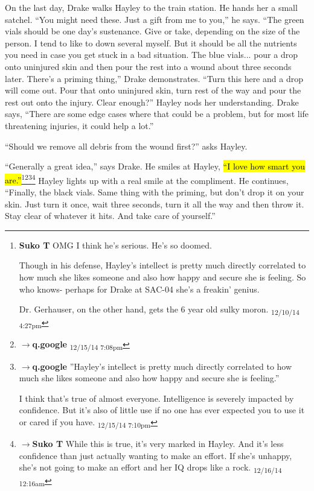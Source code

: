 On the last day, Drake walks Hayley to the train station.  He hands her a small satchel.  ``You might need these.  Just a gift from me to you,'' he says.  ``The green vials should be one day's sustenance.  Give or take, depending on the size of the person.  I tend to like to down several myself.  But it should be all the nutrients you need in case you get stuck in a bad situation.  The blue vials... pour a drop onto uninjured skin and then pour the rest into a wound about three seconds later.  There's a priming thing,'' Drake demonstrates. ``Turn this here and a drop will come out.  Pour that onto uninjured skin, turn rest of the way and pour the rest out onto the injury.  Clear enough?''  Hayley nods her understanding.  Drake says, ``There are some edge cases where that could be a problem, but for most life threatening injuries, it could help a lot.''

``Should we remove all debris from the wound first?'' asks Hayley.

``Generally a great idea,'' says Drake. He smiles at Hayley, \hl{``I love how smart you are.''}\footnote{\textbf{Suko T }OMG I think he's serious.  He's so doomed.

Though in his defense, Hayley's intellect is pretty much directly correlated to how much she likes someone and also how happy and secure she is feeling.  So who knows- perhaps for Drake at SAC-04 she's a freakin' genius.  

Dr. Gerhauser, on the other hand, gets the 6 year old sulky moron. \textsubscript{12/10/14 4:27pm}}\footnote{$\rightarrow$\textbf{q.google } \textsubscript{12/15/14 7:08pm}}\footnote{$\rightarrow$\textbf{q.google }''Hayley's intellect is pretty much directly correlated to how much she likes someone and also how happy and secure she is feeling.''

I think that's true of almost everyone.  Intelligence is severely impacted by confidence.  But it's also of little use if no one has ever expected you to use it or cared if you have. \textsubscript{12/15/14 7:10pm}}\footnote{$\rightarrow$\textbf{Suko T }While this is true, it's very marked in Hayley.  And it's less confidence than just actually wanting to make an effort.  If she's unhappy, she's not going to make an effort and her IQ drops like a rock. \textsubscript{12/16/14 12:16am}}   Hayley lights up with a real smile at the compliment.  He continues, ``Finally, the black vials.  Same thing with the priming, but don't drop it on your skin.  Just turn it once, wait three seconds, turn it all the way and then throw it.  Stay clear of whatever it hits.   And take care of yourself.''

